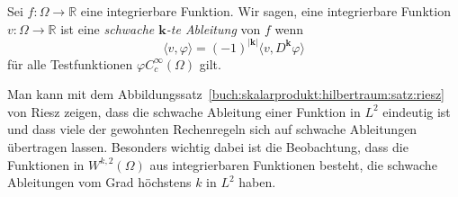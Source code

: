 \begin{definition}
Sei $f\colon\Omega\to\mathbb{R}$  eine integrierbare Funktion.
Wir sagen, eine integrierbare Funktion $v\colon\Omega\to\mathbb{R}$ 
ist eine {\em schwache $\bm{k}$-te Ableitung} von $f$ wenn 
\[
\langle v,\varphi\rangle
=
(-1)^{|\bm{k}|} \langle v,D^{\bm{k}}\varphi\rangle
\]
für alle Testfunktionen $\varphi C_c^{\infty}(\Omega)$ gilt.
\end{definition}

Man kann mit dem
Abbildungssatz~\ref{buch:skalarprodukt:hilbertraum:satz:riesz}
von Riesz zeigen, dass die schwache Ableitung einer Funktion
in $L^2$ eindeutig ist und dass viele der gewohnten Rechenregeln
sich auf schwache Ableitungen übertragen lassen.
Besonders wichtig dabei ist die Beobachtung, dass die Funktionen
in $W^{k,2}(\Omega)$ aus integrierbaren Funktionen besteht, die 
schwache Ableitungen vom Grad höchstens $k$ in $L^2$ haben.

